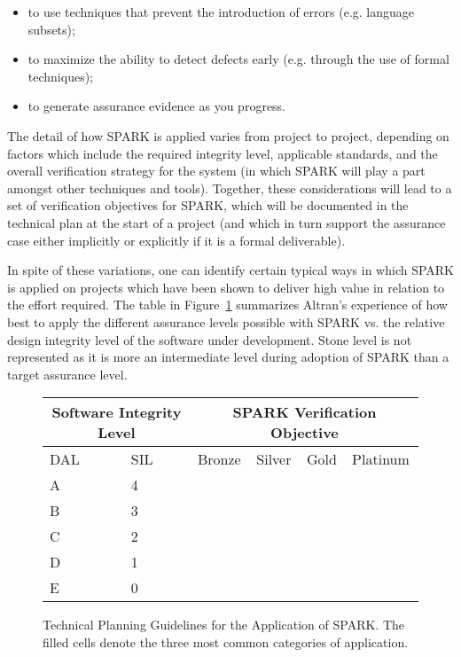 \documentclass{eceasst}
\begin{document}
\begin{itemize}
\item to use techniques that prevent the introduction of errors (e.g. language
  subsets);
\item to maximize the ability to detect defects early (e.g. through the use of
  formal techniques);
\item to generate assurance evidence as you progress.
\end{itemize}

The detail of how SPARK is applied varies from project to project, depending on
factors which include the required integrity level, applicable standards, and
the overall verification strategy for the system (in which SPARK will play a
part amongst other techniques and tools). Together, these considerations will
lead to a set of verification objectives for SPARK, which will be documented in
the technical plan at the start of a project (and which in turn support the
assurance case either implicitly or explicitly if it is a formal deliverable).

In spite of these variations, one can identify certain typical ways in which
SPARK is applied on projects which have been shown to deliver high value in
relation to the effort required. The table in Figure~\ref{fig:levels}
summarizes Altran's experience of how best to apply the different assurance levels
possible with SPARK vs. the relative design integrity level of the software
under development.  Stone level is not represented as it is more an
intermediate level during adoption of SPARK than a target assurance level.

\begin{figure}

\begin{center}
\begin{tabular}{|p{1.5cm}|p{1.5cm}|p{1.5cm}|p{1.5cm}|p{1.5cm}|p{1.5cm}|} \hline
\multicolumn{2}{|c|}{Software Integrity Level} & \multicolumn{4}{c|}{SPARK Verification Objective} \\  \hline
DAL & SIL & Bronze & Silver & Gold & Platinum \\ \hline
A   & 4   &        & \cellcolor{black} & \cellcolor{black} & \cellcolor{black} \\ \hline
B   & 3   &        & \cellcolor{black} & \cellcolor{black} & \cellcolor{black} \\ \hline
C   & 2   &        & \cellcolor{black!50} & \cellcolor{black!50} & \\ \hline
D   & 1   &        & \cellcolor{black!50} & \cellcolor{black!50} & \\ \hline
E   & 0   & \cellcolor{gray!30} & \cellcolor{gray!30} & & \\ \hline
\end{tabular}
\end{center}

\caption{Technical Planning Guidelines for the Application of SPARK.  The
  filled cells denote the three most common categories of application.}
\label{fig:levels}
\end{figure}
\end{document}

